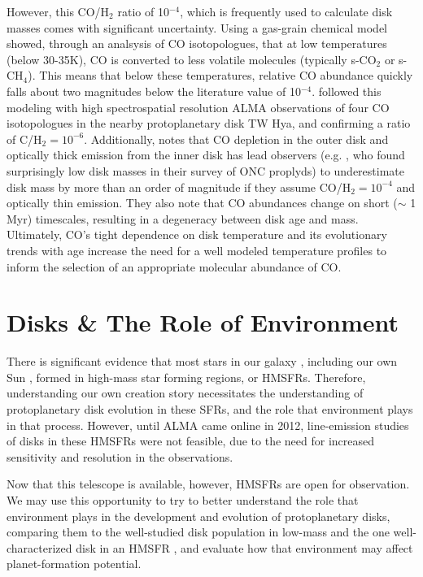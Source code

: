 However, this CO/H$_2$ ratio of 10$^{-4}$, which is frequently used to calculate disk masses  comes with significant uncertainty. Using a gas-grain chemical model \citet{Reboussin2015} showed, through an analsysis of CO isotopologues, that at low temperatures (below 30-35K), CO is converted to less volatile molecules (typically s-CO$_2$ or s-CH$_4$). This means that below these temperatures, relative CO abundance quickly falls about two magnitudes below the literature value of 10$^{-4}$. \citet{Schwarz2016} followed this modeling with high spectrospatial resolution ALMA observations of four CO isotopologues in the nearby protoplanetary disk TW Hya, and confirming a ratio of C/H$_2 = 10^{-6}$. Additionally, \cite{Yu2017} notes that CO depletion in the outer disk and optically thick emission from the inner disk has lead observers (e.g. \citet{Ansdell2017}, who found surprisingly low disk masses in their survey of ONC proplyds) to underestimate disk mass by more than an order of magnitude if they assume CO/H$_2 = 10^{-4}$ and optically thin emission. They also note that CO abundances change on short ($\sim$ 1 Myr) timescales, resulting in a degeneracy between disk age and mass. Ultimately, CO's tight dependence on disk temperature and its evolutionary trends with age increase the need for a well modeled temperature profiles to inform the selection of an appropriate molecular abundance of CO.



\section{Disks \& The Role of Environment}



There is significant evidence that most stars in our galaxy \citep{LadaLada2003,Mann2015}, including our own Sun \citep{Gaidos2009,Tachibana2006}, formed in high-mass star forming regions, or HMSFRs. Therefore, understanding our own creation story necessitates the understanding of protoplanetary disk evolution in these SFRs, and the role that environment plays in that process. However, until ALMA came online in 2012, line-emission studies of disks in these HMSFRs were not feasible, due to the need for increased sensitivity and resolution in the observations.

Now that this telescope is available, however, HMSFRs are open for observation. We may use this opportunity to try to better understand the role that environment plays in the development and evolution of protoplanetary disks, comparing them to the well-studied disk population in low-mass \citep{AndrewsWilliams2005,Mann2015} and the one well-characterized disk in an HMSFR \citep{Factor2017}, and evaluate how that environment may affect planet-formation potential.

